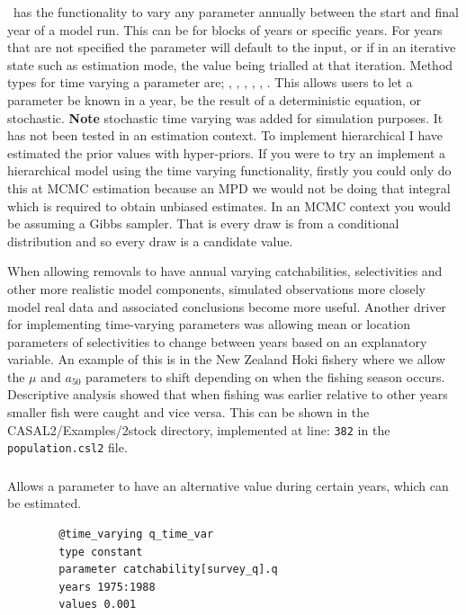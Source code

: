 \CNAME\ has the functionality to vary any parameter annually between the start and final year of a model run. This can be for blocks of years or specific years. For years that are not specified the parameter will default to the input, or if in an iterative state such as estimation mode, the value being trialled at that iteration. Method types for time varying a parameter are; , , , , , . This allows users to let a parameter be known in a year, be the result of a deterministic equation, or stochastic. \textbf{Note} stochastic time varying was added for simulation purposes. It has not been tested in an estimation context. To implement hierarchical I have estimated the prior values with hyper-priors. If you were to try an implement a hierarchical model using the time varying functionality, firstly you could only do this at MCMC estimation because an MPD we would not be doing that integral which is required to obtain unbiased estimates. In an MCMC context you would be assuming a Gibbs sampler. That is every draw is from a conditional distribution and so every draw is a candidate value.

When allowing removals to have annual varying catchabilities, selectivities and other more realistic model components, simulated observations more closely model real data and associated conclusions become more useful. Another driver for implementing time-varying parameters was allowing mean or location parameters of selectivities to change between years based on an explanatory variable. An example of this is in the New Zealand Hoki fishery where we allow the $\mu$ and $a_{50}$ parameters to shift depending on when the fishing season occurs. Descriptive analysis showed that when fishing was earlier relative to other years smaller fish were caught and vice versa. This can be shown in the CASAL2/Examples/2stock directory, implemented at line: \texttt{382} in the \texttt{population.csl2} file.

\subsubsection[Constant]{}
Allows a parameter to have an alternative value during certain years, which can be estimated.
{\small{\begin{verbatim}
		@time_varying q_time_var
		type constant
		parameter catchability[survey_q].q
		years 1975:1988
		values 0.001
		\end{verbatim}}}

